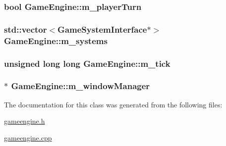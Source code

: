 \hypertarget{classGameEngine_af947cd69a795991a32716391175f61bc}{
\subsubsection[{m\-\_\-player\-Turn}]{\setlength{\rightskip}{0pt plus 5cm}bool Game\-Engine\-::m\-\_\-player\-Turn\hspace{0.3cm}{\ttfamily [private]}}}\label{classGameEngine_af947cd69a795991a32716391175f61bc}
\hypertarget{classGameEngine_acc3e703e0019b3a5920a2d01339ccd68}{
\subsubsection[{m\-\_\-systems}]{\setlength{\rightskip}{0pt plus 5cm}std\-::vector$<${\bf Game\-System\-Interface}$\ast$$>$ Game\-Engine\-::m\-\_\-systems\hspace{0.3cm}{\ttfamily [private]}}}\label{classGameEngine_acc3e703e0019b3a5920a2d01339ccd68}
\hypertarget{classGameEngine_ae50a77cf15fb12d6bb3e70ea64d4e652}{
\subsubsection[{m\-\_\-tick}]{\setlength{\rightskip}{0pt plus 5cm}unsigned long long Game\-Engine\-::m\-\_\-tick\hspace{0.3cm}{\ttfamily [private]}}}\label{classGameEngine_ae50a77cf15fb12d6bb3e70ea64d4e652}
\hypertarget{classGameEngine_a3308c8793731727773dbbd4614e06db6}{
\subsubsection[{m\-\_\-window\-Manager}]{$\ast$ Game\-Engine\-::m\-\_\-window\-Manager\hspace{0.3cm}{\ttfamily [private]}}}\label{classGameEngine_a3308c8793731727773dbbd4614e06db6}


The documentation for this class was generated from the following files\-:\begin{DoxyCompactItemize}
\item 
\hyperlink{gameengine_8h}{gameengine.\-h}\item 
\hyperlink{gameengine_8cpp}{gameengine.\-cpp}\end{DoxyCompactItemize}
